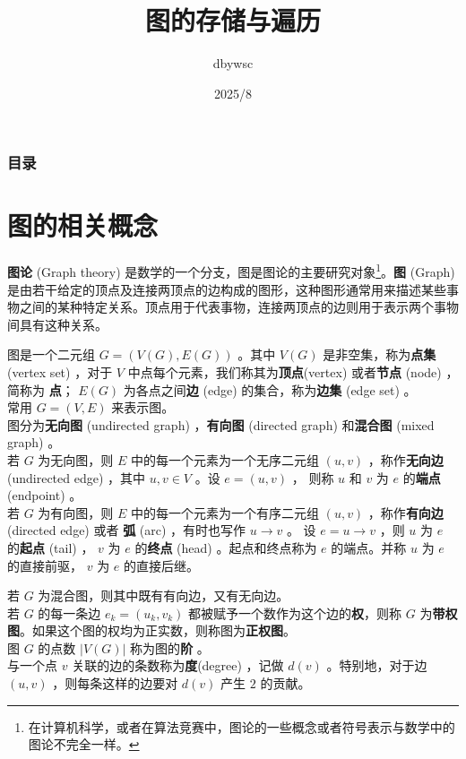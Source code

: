 \documentclass{beamer}
\title{图的存储与遍历}
\author{dbywsc}
\date{2025/8}
\newcommand{\fdf}[1]{\alert{\textbf{#1}}}
\begin{document}
\frame{\titlepage}
\begin{frame}
	\frametitle{目录}
	\tableofcontents
\end{frame}
\section{图的相关概念}
\begin{frame}
\fdf{图论} (Graph theory) 是数学的一个分支，图是图论的主要研究对象\footnote{在计算机科学，或者在算法竞赛中，图论的一些概念或者符号表示与数学中的图论不完全一样。}。\fdf{图} (Graph) 是由若干给定的顶点及连接两顶点的边构成的图形，这种图形通常用来描述某些事物之间的某种特定关系。顶点用于代表事物，连接两顶点的边则用于表示两个事物间具有这种关系。
\end{frame}
\begin{frame}
图是一个二元组 $G = (V(G), E(G))$ 。其中 $V(G)$ 是非空集，称为\fdf{点集} (vertex set) ，对于 $V$ 中点每个元素，我们称其为\fdf{顶点}(vertex) 或者\fdf{节点} (node) ，简称为 \fdf{点}； $E(G)$ 为各点之间\fdf{边} (edge) 的集合，称为\fdf{边集} (edge set) 。 \\ 
常用 $G = (V, E)$ 来表示图。 \\ 
图分为\fdf{无向图} (undirected graph) ，\fdf{有向图} (directed graph) 和\fdf{混合图} (mixed graph) 。\\ 
若 $G$ 为无向图，则 $E$ 中的每一个元素为一个无序二元组 $(u, v)$ ，称作\fdf{无向边} (undirected edge) ，其中 $u, v \in V$ 。设 $e = (u, v)$ ， 则称 $u$ 和 $v$ 为 $e$ 的\fdf{端点} (endpoint) 。\\
若 $G$ 为有向图，则 $E$ 中的每一个元素为一个有序二元组 $(u, v)$ ，称作\fdf{有向边} (directed edge) 或者 \fdf{弧} (arc) ，有时也写作 $u \rightarrow v$ 。 设 $e = u \rightarrow v$ ，则 $u$ 为 $e$ 的\fdf{起点} (tail) ， $v$ 为 $e$ 的\fdf{终点} (head) 。起点和终点称为 $e$ 的端点。并称 $u$ 为 $e$ 的直接前驱， $v$ 为 $e$ 的直接后继。
\end{frame}
\begin{frame}
若 $G$ 为混合图，则其中既有有向边，又有无向边。\\
若 $G$ 的每一条边 $e_k = (u_k, v_k)$ 都被赋予一个数作为这个边的\fdf{权}，则称 $G$ 为\fdf{带权图}。如果这个图的权均为正实数，则称图为\fdf{正权图}。\\
图 $G$ 的点数 $| V(G) |$ 称为图的\fdf{阶} 。 \\ 
与一个点 $v$ 关联的边的条数称为\fdf{度}(degree) ，记做 $d(v)$ 。特别地，对于边 $(u, v)$ ，则每条这样的边要对 $d(v)$ 产生	$2$ 的贡献。\\ 
\end{frame}
\end{document}
